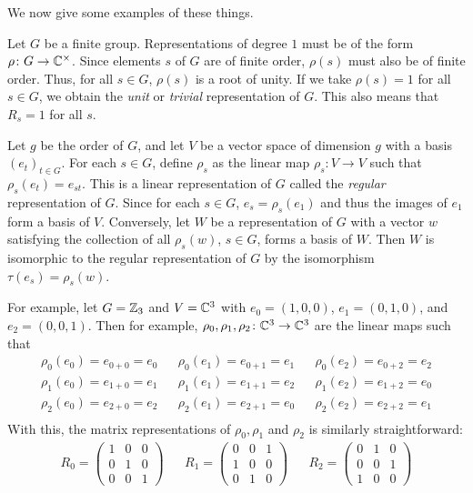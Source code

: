 \documentclass[letterpaper, 11pt, oneside]{book}
\begin{document}
We now give some examples of these things.
\begin{ex}
  Let $G$ be a finite group.
  Representations of degree $1$ must be of the form $\rho\colon G \to \mathbb{C}^{\times}$.
  Since elements $s$ of $G$ are of finite order, $\rho(s)$ must also be of finite order.
  Thus, for all $s \in G$, $\rho(s)$ is a root of unity.
  If we take $\rho(s) = 1$ for all $s \in G$, we obtain the \emph{unit} or \emph{trivial} representation of $G$.
  This also means that $R_{s} = 1$ for all $s$.
\end{ex}

\begin{ex}
  Let $g$ be the order of $G$, and let $V$ be a vector space of dimension $g$ with a basis $(e_{t})_{t \in G}$.
  For each $s \in G$, define $\rho_{s}$ as the linear map $\rho_{s}\colon V \to V$ such that $\rho_{s}(e_{t}) = e_{st}$.
  This is a linear representation of $G$ called the \emph{regular} representation of $G$.
  Since for each $s \in G$, $e_{s} = \rho_{s}(e_{1})$ and thus the images of $e_{1}$ form a basis of $V$.
  Conversely, let $W$ be a representation of $G$ with a vector $w$ satisfying the collection of all $\rho_{s}(w)$, $s \in G$, forms a basis of $W$.
  Then $W$ is isomorphic to the regular representation of $G$ by the isomorphism $\tau(e_{s}) = \rho_{s}(w)$.

  For example, let $G = \mathbb{Z}_{3}$ and $V = \mathbb{C}^{3}$ with $e_{0} = (1, 0, 0)$, $e_{1} = (0, 1, 0)$, and $e_{2} = (0, 0, 1)$.
  Then for example, $\rho_{0}, \rho_{1}, \rho_{2}\colon \mathbb{C}^{3} \to \mathbb{C}^{3}$ are the linear maps such that
  \begin{align*}
    \rho_{0}(e_{0}) = e_{0 + 0} = e_{0} && \rho_{0}(e_{1}) = e_{0 + 1} = e_{1} && \rho_{0}(e_{2}) = e_{0 + 2} = e_{2} \\
    \rho_{1}(e_{0}) = e_{1 + 0} = e_{1} && \rho_{1}(e_{1}) = e_{1 + 1} = e_{2} && \rho_{1}(e_{2}) = e_{1 + 2} = e_{0} \\
    \rho_{2}(e_{0}) = e_{2 + 0} = e_{2} && \rho_{2}(e_{1}) = e_{2 + 1} = e_{0} && \rho_{2}(e_{2}) = e_{2 + 2} = e_{1} \\
  \end{align*}
  With this, the matrix representations of $\rho_{0}, \rho_{1}$ and $\rho_{2}$ is similarly straightforward:
  \begin{align*}
    R_{0} = \begin{pmatrix} 1 & 0 & 0 \\ 0 & 1 & 0 \\ 0 & 0 & 1 \end{pmatrix} && R_{1} = \begin{pmatrix} 0 & 0 & 1 \\ 1 & 0 & 0 \\ 0 & 1 & 0 \end{pmatrix} && R_{2} = \begin{pmatrix} 0 & 1 & 0 \\ 0 & 0 & 1 \\ 1 & 0 & 0 \end{pmatrix}
  \end{align*}
\end{ex}
\end{document}
